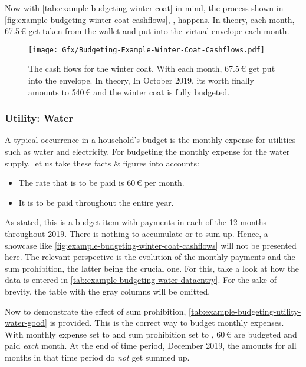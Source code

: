 Now with \autoref{tab:example-budgeting-winter-coat} in mind, the process shown in \autoref{fig:example-budgeting-winter-coat-cashflows}, , happens.
In theory, each month, 67.5\,€ get taken from the wallet and put into the virtual envelope each month.

\begin{figure}[hbtp]
	\centering
	\caption[The Cash Flows for the Winter Coat]{The cash flows for the winter coat.
	With each month, 67.5\,€ get put into the envelope.
	In theory, 
	In October 2019, its worth finally amounts to 540\,€ and the winter coat is fully budgeted.}
	\label{fig:example-budgeting-winter-coat-cashflows}
	\texttt{[image: Gfx/Budgeting-Example-Winter-Coat-Cashflows.pdf]}
\end{figure}

\subsubsection{Utility: Water}
\label{subsubsec:example-budgeting-utility-water}

A typical occurrence in a household's budget is the monthly expense for utilities such as water and electricity.
For budgeting the monthly expense for the water supply, let us take these facts \& figures into accounts:
\begin{itemize}
	\item The rate that is to be paid is 60\,€ per month.
	\item It is to be paid throughout the entire year.
\end{itemize}

As stated, this is a budget item with payments in each of the 12 months throughout 2019.
There is nothing to accumulate or to sum up.
Hence, a showcase like \autoref{fig:example-budgeting-winter-coat-cashflows} will not be presented here.
The relevant perspective is the evolution of the monthly payments and the sum prohibition, the latter being the crucial one.
For this, take a look at how the data is entered in \autoref{tab:example-budgeting-water-dataentry}.
For the sake of brevity, the table with the gray columns will be omitted.

Now to demonstrate the effect of sum prohibition, \autoref{tab:example-budgeting-utility-water-good} is provided.
This is the correct way to budget monthly expenses.
With monthly expense set to  and sum prohibition set to , 60\,€ are budgeted and paid \emph{each} month.
At the end of time period, \ie December 2019, the amounts for all months in that time period do \emph{not} get summed up.

